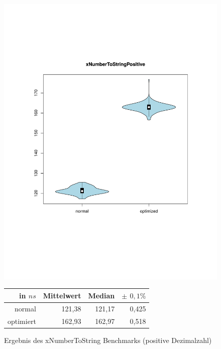 \begin{figure}[H]
{		\includegraphics[trim=20mm 60mm 0mm 50mm,scale=0.50]{pictures/vioplot_xNumberToStringPositive.pdf}
	}
	\begin{table}[H]
	\centering
		\begin{tabular}{|r|r|r|r|}
			\hline
		   	in $ns$  & Mittelwert & Median & \bf{$\pm$ $0,1\%$} \\
		 	\hline
		 	\hline
		  	normal 	  & 121,38 & 121,17 & 0,425 \\
		 	optimiert & 162,93 & 162,97 & 0,518 \\ 
		  	\hline
		  	
		\end{tabular}
	\end{table}

	\caption{Ergebnis des xNumberToString Benchmarks (positive Dezimalzahl)}\label{bp:xNumPos}
\end{figure}



